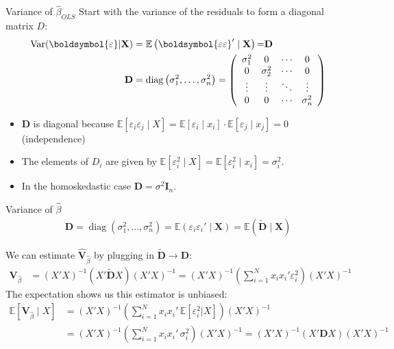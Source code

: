 \documentclass[aspectratio=169,11pt]{beamer}
\begin{document}
\begin{frame}{Variance of $\widehat{\beta}_{OLS}$}
Start with the variance of the residuals to form a \alert{diagonal} matrix $D$:
\begin{align*}
\operatorname { Var } ( \boldsymbol{\varepsilon} | \mathbf { X } ) &= \mathbb { E } \left( \boldsymbol{\varepsilon \varepsilon} ^ { \prime } \mid \mathbf { X } \right){ = } \mathbf { D }\\
\mathbf { D } &= \operatorname { diag } \left( \sigma _ { 1 } ^ { 2 } , \ldots , \sigma _ { n } ^ { 2 } \right) = \left( \begin{array} { c c c c } { \sigma _ { 1 } ^ { 2 } } & { 0 } & { \cdots } & { 0 } \\ { 0 } & { \sigma _ { 2 } ^ { 2 } } & { \cdots } & { 0 } \\ { \vdots } & { \vdots } & { \ddots } & { \vdots } \\ { 0 } & { 0 } & { \cdots } & { \sigma _ { n } ^ { 2 } } \end{array} \right)
\end{align*}
\begin{itemize}
\item $\mathbf{D}$ is diagonal because $\mathbb { E }[\varepsilon_i \varepsilon_j \mid  X] = \mathbb { E }[\varepsilon_i  \mid x_i] \cdot \mathbb { E }[\varepsilon_j  \mid  x_j]=0$ (independence)
\item The elements of $D_i$ are given by $\mathbb { E }[\varepsilon_i^2 \mid  X] = \mathbb { E }[\varepsilon_i^2 \mid x_i] = \sigma_i^2$.
\item In the \alert{homoskedastic} case $\mathbf{D} = \sigma^2 \mathbf{I}_n$.
\end{itemize}
\end{frame}


\begin{frame}{Variance of $\widehat{\beta}$}
\small
\begin{align*}
\mathbf { D } = \operatorname { diag } \left( \sigma _ { 1 } ^ { 2 } , \ldots , \sigma _ { n } ^ { 2 } \right)
= \mathbb { E } \left( \varepsilon_i \varepsilon_i'  \mid \mathbf { X } \right)
= \mathbb { E } \left( \widetilde{\mathbf{D}} \mid  \mathbf { X } \right)
\end{align*}

We can estimate $\widehat{\mathbf{V}}_{\widehat{\beta}}$ by plugging in $\widetilde{\mathbf{D}} \rightarrow \mathbf{D}$:
\begin{align*}
\mathbf{V}_{\widehat{\beta}} &= (X'X)^{-1} (X'  \widetilde{\mathbf{D}} X) (X'X)^{-1}
= (X'X)^{-1} \left(\sum_{i=1}^N x_i x_i' \varepsilon_i^2  \right) (X'X)^{-1} 
\end{align*}
The expectation shows us this estimator is unbiased:
\begin{align*}
\mathbb{E}[\mathbf{V}_{\widehat{\beta}} \mid X] &= (X'X)^{-1} \left(\sum_{i=1}^N x_i x_i'\, \mathbb{E}[\varepsilon_i^2 | X] \right) (X'X)^{-1} \\
&= (X'X)^{-1} \left(\sum_{i=1}^N x_i x_i' \, \sigma_i^2 \right) (X'X)^{-1} = (X'X)^{-1} (X' \mathbf{D} X) (X'X)^{-1} 
\end{align*}
\end{frame}
\end{document}
